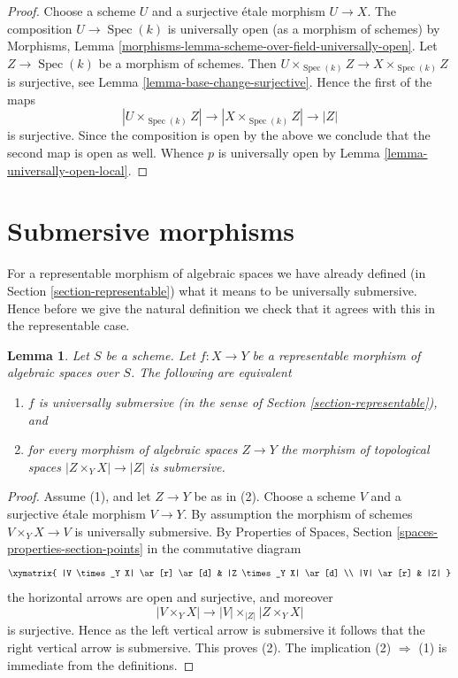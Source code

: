 \documentclass{stacks-project}
\theoremstyle{plain}
\newtheorem{lemma}[subsection]{Lemma}
\theoremstyle{definition}
\theoremstyle{remark}
\numberwithin{equation}{subsection}
\def\Spec{\mathop{\mathrm{Spec}}}
\begin{document}
\begin{proof}
Choose a scheme $U$ and a surjective \'etale morphism $U \to X$.
The composition $U \to \Spec(k)$ is universally open (as a morphism
of schemes) by
Morphisms, Lemma \ref{morphisms-lemma-scheme-over-field-universally-open}.
Let $Z \to \Spec(k)$ be a morphism of schemes. Then
$U \times_{\Spec(k)} Z \to X \times_{\Spec(k)} Z$ is surjective,
see
Lemma \ref{lemma-base-change-surjective}.
Hence the first of the maps
$$
|U \times_{\Spec(k)} Z| \to |X \times_{\Spec(k)} Z| \to |Z|
$$
is surjective. Since the composition is open by the above we conclude that
the second map is open as well. Whence $p$ is universally open by
Lemma \ref{lemma-universally-open-local}.
\end{proof}








\section{Submersive morphisms}
\label{section-submersive}

\noindent
For a representable morphism of algebraic spaces we have already defined (in
Section \ref{section-representable})
what it means to be universally submersive. Hence before we give the natural
definition we check that it agrees with this in the representable case.

\begin{lemma}
\label{lemma-characterize-representable-universally-submersive}
Let $S$ be a scheme. Let $f : X \to Y$ be a representable morphism of
algebraic spaces over $S$. The following are equivalent
\begin{enumerate}
\item $f$ is universally submersive
(in the sense of Section \ref{section-representable}), and
\item for every morphism of algebraic spaces $Z \to Y$ the morphism of
topological spaces $|Z \times_Y X| \to |Z|$ is submersive.
\end{enumerate}
\end{lemma}

\begin{proof}
Assume (1), and let $Z \to Y$ be as in (2). Choose a scheme $V$ and
a surjective \'etale morphism $V \to Y$. By assumption the morphism
of schemes $V \times_Y X \to V$ is universally submersive. By
Properties of Spaces, Section \ref{spaces-properties-section-points}
in the commutative diagram
$$
\xymatrix{
|V \times_Y X| \ar[r] \ar[d] & |Z \times_Y X| \ar[d] \\
|V| \ar[r] & |Z|
}
$$
the horizontal arrows are open and surjective, and moreover
$$
|V \times_Y X| \longrightarrow |V| \times_{|Z|} |Z \times_Y X|
$$
is surjective. Hence as the left vertical arrow is submersive
it follows that the right vertical arrow is submersive.
This proves (2). The implication (2) $\Rightarrow$ (1) is
immediate from the definitions.
\end{proof}
\end{document}
